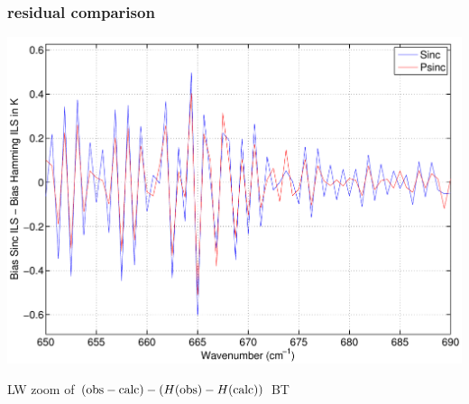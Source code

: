 \documentclass[11pt]{beamer}
\begin{document}
\begin{frame}
\frametitle{residual comparison}

\begin{center}
  \includegraphics[scale=0.4]{strow_figs/bias_sinc_minus_bias_ham_LW.pdf}
\end{center}

LW zoom of $(\mbox{obs} - \mbox{calc}) - (H(\mbox{obs}) - H(\mbox{calc}))$ BT


\end{frame}
\end{document}
